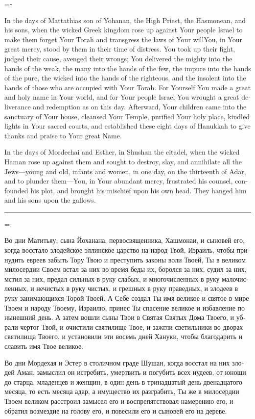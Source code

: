 \documentclass[11pt,twoside]{article}
\newcommand{\instructionen}[1]{%
\noindent{\englishprose\fontsize{5.2}{6.2}\selectfont\textbf{\textit{#1}}}%
}
\newcommand{\instructionru}[1]{%
\noindent{\russianprose\fontsize{5.2}{6.2}\textbf{\textit{#1}}}%
}
\begin{document}
{\fontsize{6}{7.1}%
\selectfont%
\lineskiplimit=-\maxdimen%
\begin{english}
\instructionen{On Hanukkah:}
In the days of Mattathias son of Yohanan, the High Priest, the
Hasmonean, and his sons, when the wicked Greek kingdom rose up against
Your people Israel to make them forget Your Torah and transgress the
laws of Your will\textemdash{}You,
in Your great mercy, stood by them in their
time of distress. You took up their fight, judged their cause, avenged
their wrongs; You delivered the mighty into the hands of the weak, the
many into the hands of the few, the impure into the hands of the pure,
the wicked into the hands of the righteous, and the insolent into the
hands of those who are occupied with Your Torah. For Yourself You made
a great and
holy name in Your world, and for Your people Israel You wrought a
great deliverance and redemption as on this day. Afterward, Your
children came into the sanctuary of Your house, cleansed Your Temple,
purified Your holy place, kindled lights in Your sacred courts, and
established these eight days of Hanukkah to give thanks and praise to
Your great Name.\par

\instructionen{On Purim:}
In the days of Mordechai and Esther, in Shushan the citadel, when the
wicked Haman rose up against them and sought to destroy, slay, and
annihilate all the Jews—young and old, infants and women, in one day,
on the thirteenth of Adar, and to plunder them—You, in Your
abundant mercy, frustrated his counsel, confounded his plot, and
brought his mischief upon his own head. They hanged him and his sons
upon the gallows.
\end{english}
\vfill%
\hrule
\vfill%
\begin{russian}
\selectfont%
\lineskiplimit=-\maxdimen%
\instructionru{В Хануку:}
Во дни Матитьяу, сына Йоханана, первосвященника, Хашмонаи, и сыновей
его, когда восстало злодейское эллинское царство на народ Твой,
Израиль, чтобы принудить евреев забыть Тору Твою и преступить законы
воли Твоей, Ты в великом милосердии Своем встал за них во время беды
их, боролся за них, судил за них, мстил за них, предал сильных в руку
слабых, и многочисленных в руку малочисленных, и нечистых в руку
чистых, и грешных в руку праведных, и злодеев в руку занимающихся
Торой Твоей. А Себе создал Ты имя великое и святое в мире Твоем и
народу Твоему, Израилю, принес Ты спасение великое и избавление по
нынешний день. А затем вошли сыны Твои в Святая Святых Дома Твоего, и
убрали чертог Твой, и очистили святилище Твое, и зажгли светильники во
дворах святилища Твоего, и установили эти восемь дней Хануки, чтобы
благодарить и славить имя Твое великое.

\instructionru{В Пурим:}
Во дни Мордехая и Эстер в столичном граде Шушан, когда восстал на них
злодей Аман, замыслил он истребить, умертвить и погубить всех иудеев,
от юноши до старца, младенцев и женщин, в один день в тринадцатый день
двенадцатого месяца, то есть месяца адар, а имущество их разграбить,
Ты же в милосердии Твоем великом расстроил замысел его и
воспрепятствовал намерению его, и обратил возмездие на голову его, и
повесили его и сыновей его на дереве.\par
\end{russian}
}
\newpage
\end{document}
